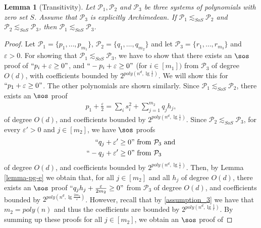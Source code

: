 \documentclass[11pt]{article}
\newtheorem{lemma}[theorem]{Lemma}
\begin{document}
\begin{lemma}[Transitivity]\label{th:transitivity_of_approximations}
    Let $\mathcal{P}_1, \mathcal{P}_2$ and $\mathcal{P}_3$ be three systems of polynomials with zero set $S$. Assume that $\mathcal{P}_3$ is explicitly Archimedean. If $\mathcal{P}_1 \lesssim_{SoS} \mathcal{P}_2$ and $\mathcal{P}_2 \lesssim_{SoS} \mathcal{P}_3$, then $\mathcal{P}_1 \lesssim_{SoS} \mathcal{P}_3$.
\end{lemma}
\begin{proof}
     Let $\mathcal{P}_1=\{p_1, \dots, p_{m_1}\}$, $\mathcal{P}_2=\{q_1, \dots, q_{m_2}\}$ and let $\mathcal{P}_3=\{r_1, \dots, r_{m_3}\}$ and $\varepsilon>0$. For showing that $\mathcal{P}_1 \lesssim_{SoS} \mathcal{P}_3$, we have to show that there exists an $\sos$ proof of $``p_i+\varepsilon\geq 0"$, and $``-p_i+\varepsilon\geq0"$ (for $i\in [m_1])$ from $\mathcal{P}_3$ of degree $O(d)$, with coefficients bounded by $2^{poly(n^d,\lg\frac{1}{\varepsilon})}$. We will show this for $``p_1+\varepsilon\geq 0"$. The other polynomials are shown similarly. Since $\mathcal{P}_1 \lesssim_{SoS} \mathcal{P}_2$, there exists an $\sos$ proof
    \begin{align}\label{p_1}
        p_1 + \frac{\varepsilon}{2} = \sum_{i} s_i^2 + \sum_{j=1}^{m_2}q_jh_j,    
    \end{align}
   of degree $O(d)$, and coefficients bounded by $2^{poly(n^d, \lg \frac{1}{\varepsilon})}$. Since $\mathcal{P}_2 \lesssim_{SoS} \mathcal{P}_3$, for every $\varepsilon'>0$ and $j\in[m_2]$, we have $\sos$ proofs
   \begin{align}\label{q_i}
   \begin{split}
    ``q_j + \varepsilon' \geq 0&"  \text{ from }\mathcal{P}_3 \text{  and}\\
    ``-q_j + \varepsilon' \geq 0&" \text{ from } \mathcal{P}_3      
   \end{split}
   \end{align}
    of degree $O(d)$, and coefficients bounded by $2^{poly(n^d, \lg \frac{1}{\varepsilon})}$. Then, by Lemma \ref{lemma-pg-e} we obtain that, for all $j\in [m_2]$ and all $h_j$ of degree $O(d)$, there exists an $\sos$ proof $``q_jh_j + \frac{\varepsilon}{2m_2}\geq 0"$ from $\mathcal{P}_3$ of degree $O(d)$, and coefficients bounded by $2^{poly(n^d, \lg \frac{2m_2}{\varepsilon})}$. However, recall that by \ref{assumption_3} we have that $m_2 = poly(n)$ and thus the coefficients are bounded by $2^{poly(n^d, \lg \frac{1}{\varepsilon})}$. By summing up these proofs for all $j\in [m_2]$, we obtain an $\sos$ proof of

\end{proof}
\end{document}
